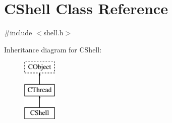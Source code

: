 \hypertarget{class_c_shell}{\section{C\-Shell Class Reference}
\label{class_c_shell}
}


{\ttfamily \#include $<$shell.\-h$>$}

Inheritance diagram for C\-Shell\-:\begin{figure}[H]
\begin{center}
\leavevmode
\includegraphics[height=3.000000cm]{de/dba/class_c_shell}
\end{center}
\end{figure}
